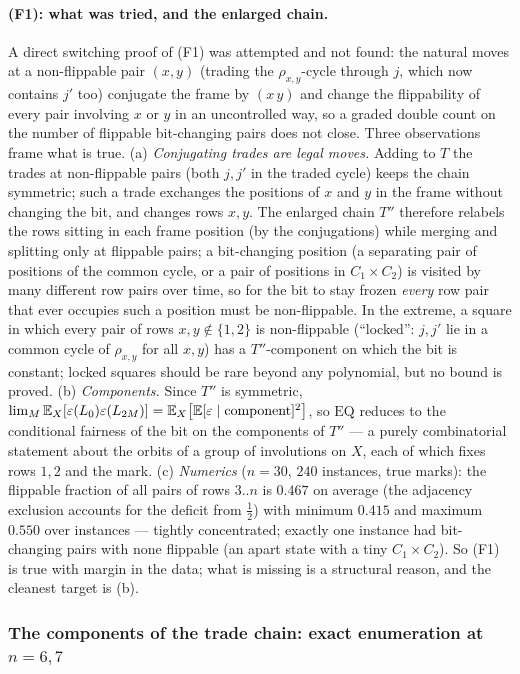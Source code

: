 \paragraph{(F1): what was tried, and the enlarged chain.}  A direct
switching proof of (F1) was attempted and not found: the natural
moves at a non-flippable pair $(x,y)$ (trading the $\rho_{x,y}$-cycle
through $j$, which now contains $j'$ too) conjugate the frame by
$(x\,y)$ and change the flippability of every pair involving $x$ or $y$
in an uncontrolled way, so a graded double count on the number of
flippable bit-changing pairs does not close.  Three observations
frame what is true.
(a) \emph{Conjugating trades are legal moves.}  Adding to $T$ the
trades at non-flippable pairs (both $j,j'$ in the traded cycle) keeps
the chain symmetric; such a trade exchanges the positions of $x$ and
$y$ in the frame without changing the bit, and changes rows $x,y$.  The
enlarged chain $T''$ therefore relabels the rows sitting in each frame
position (by the conjugations) while merging and splitting only at
flippable pairs; a bit-changing position (a separating pair of
positions of the common cycle, or a pair of positions in $C_1\times C_2$)
is visited by many different row pairs over time, so for the bit to
stay frozen \emph{every} row pair that ever occupies such a position
must be non-flippable.  In the extreme, a square in which every pair of
rows $x,y\notin\{1,2\}$ is non-flippable (``locked'': $j,j'$ lie in a
common cycle of $\rho_{x,y}$ for all $x,y$) has a $T''$-component on
which the bit is constant; locked squares should be rare beyond any
polynomial, but no bound is proved.
(b) \emph{Components.}  Since $T''$ is symmetric,
$\lim_M\mathbb{E}_X[\varepsilon(L_0)\varepsilon(L_{2M})]=\mathbb{E}_X\bigl[\mathbb{E}[\varepsilon\mid\text{component}]^2\bigr]$,
so $\mathrm{EQ}$ reduces to the conditional fairness of the bit on
the components of $T''$ --- a purely combinatorial statement about the
orbits of a group of involutions on $X$, each of which fixes rows $1,2$
and the mark.
(c) \emph{Numerics} ($n=30$, $240$ instances, true marks): the flippable
fraction of all pairs of rows $3..n$ is $0.467$ on average (the
adjacency exclusion accounts for the deficit from $\tfrac12$) with
minimum $0.415$ and maximum $0.550$ over instances --- tightly
concentrated; exactly one instance had bit-changing pairs with none
flippable (an apart state with a tiny $C_1\times C_2$).  So (F1) is true
with margin in the data; what is missing is a structural reason, and
the cleanest target is (b).

\subsubsection{The components of the trade chain: exact enumeration at
\texorpdfstring{$n=6,7$}{n=6,7}}\label{sec:s13comp7}

